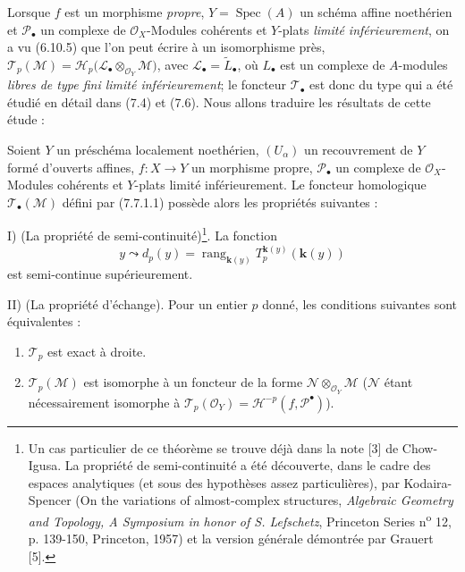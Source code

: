 \begin{env}[7.7.4]
Lorsque $f$ est un morphisme \emph{propre}, $Y=\operatorname{Spec}(A)$ un schéma
affine noethérien et $\mathscr P_\bullet$ un complexe de
$\mathscr O_X$-Modules cohérents et $Y$-plats \emph{limité inférieurement}, on a
vu (6.10.5) que l'on peut écrire à un isomorphisme près,
$\mathscr T_p(\mathscr M)=\mathscr H_p\bigl(\mathscr L_\bullet\otimes_{\mathscr O_Y}\mathscr M\bigr)$,
avec $\mathscr L_\bullet=\widetilde{L}_\bullet$,
où $L_\bullet$ est un complexe de $A$-modules \emph{libres de type fini limité
inférieurement}; le foncteur $\mathscr T_\bullet$ est donc du type qui a été
étudié en détail dans (7.4) et (7.6). Nous allons traduire les résultats de cette
étude :
\end{env}

\begin{theorem}[7.7.5]
Soient $Y$ un préschéma localement noethérien, $(U_\alpha)$ un recouvrement de
$Y$ formé d'ouverts affines, $f:X\to Y$ un morphisme propre,
$\mathscr P_\bullet$ un complexe de $\mathscr O_X$-Modules cohérents et $Y$-plats
limité inférieurement. Le foncteur homologique $\mathscr T_\bullet(\mathscr M)$
défini par (7.7.1.1) possède alors les propriétés suivantes :

\medskip
\noindent
\textnormal{I) (La propriété de semi-continuité)}\footnote{Un cas particulier de
ce théorème se trouve déjà dans la note [3] de Chow-Igusa. La propriété de
semi-continuité a été découverte, dans le cadre des espaces analytiques (et sous
des hypothèses assez particulières), par Kodaira-Spencer (On the variations of
almost-complex structures, \emph{Algebraic Geometry and Topology, A Symposium in
honor of S. Lefschetz}, Princeton Series n\textsuperscript{o} 12, p. 139-150,
Princeton, 1957) et la version générale démontrée par Grauert [5].}.
La fonction
\[
  y\leadsto
  d_p(y)
  =
  \operatorname{rang}_{\mathbf{k}(y)}
    T_p^{\mathbf{k}(y)}(\boldsymbol{k}(y))
  \tag{7.7.5.1}\label{III.7.7.5.1.fr}
\]
est semi-continue supérieurement.

\medskip
\noindent
\textnormal{II) (La propriété d'échange).}
Pour un entier $p$ donné, les conditions suivantes sont équivalentes :
\begin{enumerate}
  \item[\textup{a)}] $\mathscr T_p$ est exact à droite.

  \item[\textup{a$'$)}] $\mathscr T_p(\mathscr M)$ est isomorphe à un foncteur de la forme
    $\mathscr N\otimes_{\mathscr O_Y}\mathscr M$ ($\mathscr N$ étant nécessairement
    isomorphe à $\mathscr T_p(\mathscr O_Y)=\mathscr H^{-p}(f,\mathscr P^\bullet)$).


\end{enumerate}
\end{theorem}
